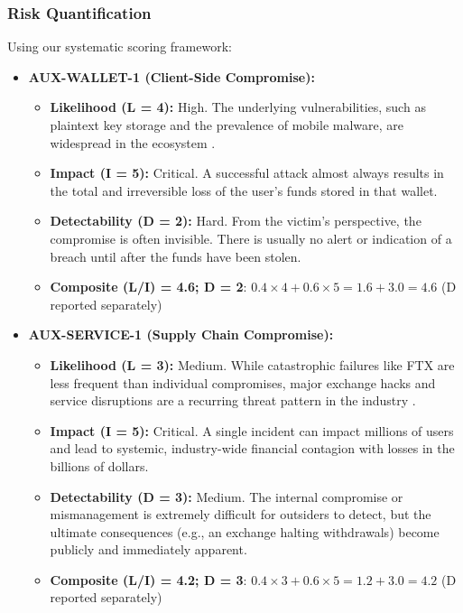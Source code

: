 \subsubsection{Risk Quantification}

Using our systematic scoring framework:

\begin{itemize}
    \item \textbf{AUX-WALLET-1 (Client-Side Compromise):}
    \begin{itemize}
        \item \textbf{Likelihood (L = 4):} High. The underlying vulnerabilities, such as plaintext key storage and the prevalence of mobile malware, are widespread in the ecosystem \cite{houy2023}.
        \item \textbf{Impact (I = 5):} Critical. A successful attack almost always results in the total and irreversible loss of the user's funds stored in that wallet.
        \item \textbf{Detectability (D = 2):} Hard. From the victim's perspective, the compromise is often invisible. There is usually no alert or indication of a breach until after the funds have been stolen.
        \item \textbf{Composite (L/I) = 4.6; D = 2}: $0.4 \times 4 + 0.6 \times 5 = 1.6 + 3.0 = 4.6$ (D reported separately)
    \end{itemize}
    
    \item \textbf{AUX-SERVICE-1 (Supply Chain Compromise):}
    \begin{itemize}
        \item \textbf{Likelihood (L = 3):} Medium. While catastrophic failures like FTX are less frequent than individual compromises, major exchange hacks and service disruptions are a recurring threat pattern in the industry \cite{houy2023}.
        \item \textbf{Impact (I = 5):} Critical. A single incident can impact millions of users and lead to systemic, industry-wide financial contagion with losses in the billions of dollars.
        \item \textbf{Detectability (D = 3):} Medium. The internal compromise or mismanagement is extremely difficult for outsiders to detect, but the ultimate consequences (e.g., an exchange halting withdrawals) become publicly and immediately apparent.
        \item \textbf{Composite (L/I) = 4.2; D = 3}: $0.4 \times 3 + 0.6 \times 5 = 1.2 + 3.0 = 4.2$ (D reported separately)
    \end{itemize}
\end{itemize}